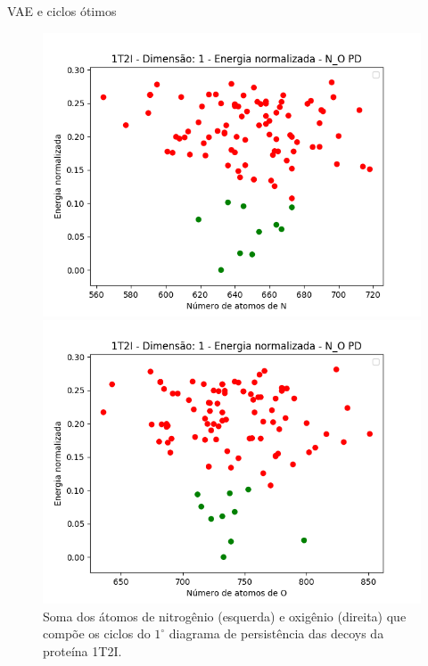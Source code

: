\documentclass[10pt]{beamer}
\begin{document}
\begin{frame}{VAE e ciclos ótimos}
    \begin{figure}
        \centering
        \begin{minipage}{0.45\textwidth}
            \centering
            \includegraphics[width=1.1\textwidth]{images/cyc1t2iN.png} %
        \end{minipage}\hfill
        \begin{minipage}{0.45\textwidth}
            \centering
            \includegraphics[width=1.1\textwidth]{images/cyc1t2iO.png} %
        \end{minipage}
        \caption{Soma dos átomos de nitrogênio (esquerda) e oxigênio (direita) que compõe os ciclos do 
        $1^\circ$ diagrama de persistência das decoys da proteína 1T2I.}
    \end{figure}
\end{frame}
\end{document}
